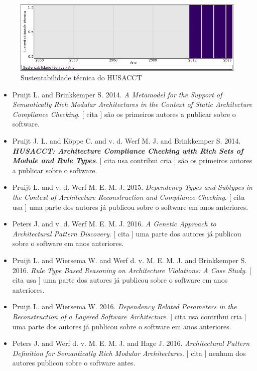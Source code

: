 \begin{figure}[h]
  \center
  \includegraphics[scale=0.50]{imagens/softwares-charts/husacct.png}
  \caption{Sustentabilidade técnica do HUSACCT}
\end{figure}


\begin{itemize}
\item Pruijt L. and Brinkkemper S.
      2014.
        \textit{ A Metamodel for the Support of Semantically Rich Modular Architectures in the Context of Static Architecture Compliance Checking}.
      [
          cita
      ]
são os primeiros autores a publicar sobre o software.
\item Pruijt J. L. and K\"{o}ppe C. and v. d. Werf M. J. and Brinkkemper S.
      2014.
        \textbf{\textit{ HUSACCT: Architecture Compliance Checking with Rich Sets of Module and Rule Types}}.
      [
          cita
          usa
          contribui
          cria
      ]
são os primeiros autores a publicar sobre o software.
\item Pruijt L. and v. d. Werf M. E. M. J.
      2015.
        \textit{ Dependency Types and Subtypes in the Context of Architecture Reconstruction and Compliance Checking}.
      [
          cita
          usa
      ]
uma parte dos autores já publicou sobre o software em anos anteriores.
\item Peters J. and v. d. Werf M. E. M. J.
      2016.
        \textit{ A Genetic Approach to Architectural Pattern Discovery}.
      [
          cita
      ]
uma parte dos autores já publicou sobre o software em anos anteriores.
\item Pruijt L. and Wiersema W. and Werf d. v. M. E. M. J. and Brinkkemper S.
      2016.
        \textit{ Rule Type Based Reasoning on Architecture Violations: A Case Study}.
      [
          cita
          usa
      ]
uma parte dos autores já publicou sobre o software em anos anteriores.
\item Pruijt L. and Wiersema W.
      2016.
        \textit{ Dependency Related Parameters in the Reconstruction of a Layered Software Architecture}.
      [
          cita
          usa
          contribui
          cria
      ]
uma parte dos autores já publicou sobre o software em anos anteriores.
\item Peters J. and Werf d. v. M. E. M. J. and Hage J.
      2016.
        \textit{ Architectural Pattern Definition for Semantically Rich Modular Architectures}.
      [
          cita
      ]
nenhum dos autores publicou sobre o software antes.
\end{itemize}
